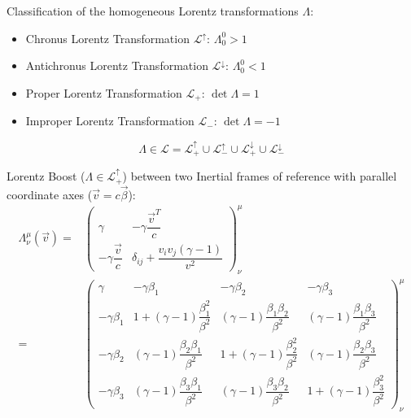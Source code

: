 			\noindent
			Classification of the homogeneous Lorentz transformations $\Lambda$:
			\begin{itemize}
				\item Chronus Lorentz Transformation $\mathcal{L}^\uparrow$: $\Lambda^0_0 > 1$
				\item Antichronus Lorentz Transformation $\mathcal{L}^\downarrow$: $\Lambda^0_0 < 1$
				\item Proper Lorentz Transformation $\mathcal{L}_+$: $\det\Lambda = 1$
				\item Improper Lorentz Transformation $\mathcal{L}_-$: $\det\Lambda = -1$
			\end{itemize}
			\begin{equation}
				\Lambda \in \mathcal{L} = \mathcal{L}^\uparrow_+ \cup \mathcal{L}^\uparrow_- \cup \mathcal{L}^\downarrow_+ \cup \mathcal{L}^\downarrow_-
			\end{equation}
			
			\noindent
			Lorentz Boost ($\Lambda\in\mathcal{L}^\uparrow_+$) between two Inertial frames of reference with parallel coordinate axes ($\vec{v}=c\vec{\beta}$):
			\begin{equation}
				\begin{aligned}
					\Lambda^{\mu}_{\nu}(\vec{v}) 
					=& \left( \begin{matrix}
						\gamma & -\gamma\dfrac{\vec{v}^T}{c} \\[6pt]
					-\gamma\dfrac{\vec{v}}{c} & \delta_{ij}+\dfrac{v_i v_j(\gamma-1)}{v^2}
					\end{matrix} \right)^{\mu}_{\nu} \\
					=&
					\left(\begin{matrix}
						\gamma & -\gamma \beta_1 & -\gamma \beta_2 & -\gamma \beta_3 \\
						-\gamma \beta_1 & 1+(\gamma -1){\dfrac {\beta_1^{2}}{\beta^{2}}} & (\gamma -1){\dfrac {\beta_1 \beta_2}{\beta^{2}}}&(\gamma -1){\dfrac {\beta_1\beta_3}{\beta^{2}}} \\
						-\gamma \beta_2 & (\gamma -1){\dfrac {\beta_2\beta_1}{\beta^{2}}} & 1+(\gamma -1){\dfrac {\beta_2^{2}}{\beta^{2}}}&(\gamma -1){\dfrac {\beta_2 \beta_3}{\beta^{2}}} \\
						-\gamma \beta_3 &(\gamma -1){\dfrac {\beta_3\beta_1}{\beta^{2}}}&(\gamma -1){\dfrac {\beta_3\beta_2}{\beta^{2}}}&1+(\gamma -1){\dfrac {\beta_3^{2}}{\beta^{2}}}
					\end{matrix}\right)^{\mu}_{\nu}
				\end{aligned}
			\end{equation}

